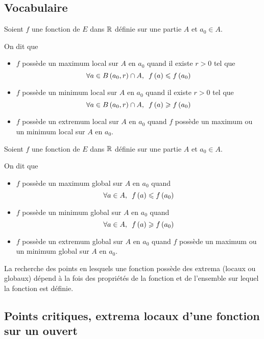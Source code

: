 \subsection{Vocabulaire}

\begin{defi}
Soient \(f\) une fonction de \(E\) dans \(\mathbb{R}\) définie sur une partie \(A\) et \(a_0\in A\).

On dit que

\begin{itemize}
    \item \(f\) possède un maximum local sur \(A\) en \(a_0\) quand il existe \(r>0\) tel que \[\quantifs{\forall a\in\bouleo{a_0}{r}\inter A}f\paren{a}\leq f\paren{a_0}\]
    \item \(f\) possède un minimum local sur \(A\) en \(a_0\) quand il existe \(r>0\) tel que \[\quantifs{\forall a\in\bouleo{a_0}{r}\inter A}f\paren{a}\geq f\paren{a_0}\]
    \item \(f\) possède un extremum local sur \(A\) en \(a_0\) quand \(f\) possède un maximum ou un minimum local sur \(A\) en \(a_0\).
\end{itemize}
\end{defi}

\begin{defi}
Soient \(f\) une fonction de \(E\) dans \(\mathbb{R}\) définie sur une partie \(A\) et \(a_0\in A\).

On dit que

\begin{itemize}
    \item \(f\) possède un maximum global sur \(A\) en \(a_0\) quand \[\quantifs{\forall a\in A}f\paren{a}\leq f\paren{a_0}\]
    \item \(f\) possède un minimum global sur \(A\) en \(a_0\) quand \[\quantifs{\forall a\in A}f\paren{a}\geq f\paren{a_0}\]
    \item \(f\) possède un extremum global sur \(A\) en \(a_0\) quand \(f\) possède un maximum ou un minimum global sur \(A\) en \(a_0\).
\end{itemize}
\end{defi}

La recherche des points en lesquels une fonction possède des extrema (locaux ou globaux) dépend à la fois des propriétés de la fonction et de l'ensemble sur lequel la fonction est définie.

\subsection{Points critiques, extrema locaux d'une fonction sur un ouvert}

